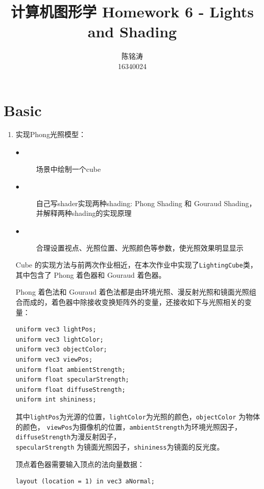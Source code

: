 \documentclass[12pt]{article}
\begin{document}
\author{陈铭涛\\16340024}
\title{计算机图形学 Homework 6 - Lights and Shading}
\maketitle

\medskip


\section{Basic}

\begin{enumerate}
    \item 实现Phong光照模型：
    \begin{description}
        \item[$\bullet$ ]场景中绘制一个cube
        \item[$\bullet$ ]自己写shader实现两种shading: Phong Shading 和 Gouraud Shading，并解释两种shading的实现原理
        \item[$\bullet$ ]合理设置视点、光照位置、光照颜色等参数，使光照效果明显显示 
    \end{description}
    Cube 的实现方法与前两次作业相近，在本次作业中实现了\lstinline{LightingCube}类，其中包含了 Phong 着色器和 Gouraud 着色器。
    
    Phong 着色法和 Gouraud 着色法都是由环境光照、漫反射光照和镜面光照组合而成的，着色器中除接收变换矩阵外的变量，还接收如下与光照相关的变量：
    \begin{lstlisting}
uniform vec3 lightPos;
uniform vec3 lightColor;
uniform vec3 objectColor;
uniform vec3 viewPos;
uniform float ambientStrength;
uniform float specularStrength;
uniform float diffuseStrength;
uniform int shininess;
    \end{lstlisting}
    其中\lstinline{lightPos}为光源的位置，\lstinline{lightColor}为光照的颜色，\lstinline{objectColor} 为物体的颜色，
    \lstinline{viewPos}为摄像机的位置，\lstinline{ambientStrength}为环境光照因子，\lstinline{diffuseStrength}为漫反射因子，
    \\\lstinline{specularStrength} 为镜面光照因子，\lstinline{shininess}为镜面的反光度。

    顶点着色器需要输入顶点的法向量数据：
    \begin{lstlisting}
layout (location = 1) in vec3 aNormal;
    \end{lstlisting}
    

\end{enumerate}
\end{document}
